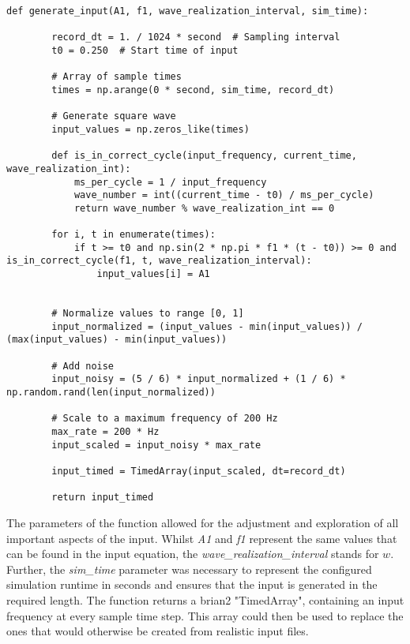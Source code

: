     \begin{lstlisting}[caption={Generate Input Function}]
    def generate_input(A1, f1, wave_realization_interval, sim_time):
        
        record_dt = 1. / 1024 * second  # Sampling interval
        t0 = 0.250  # Start time of input
    
        # Array of sample times
        times = np.arange(0 * second, sim_time, record_dt)
    
        # Generate square wave
        input_values = np.zeros_like(times)
    
        def is_in_correct_cycle(input_frequency, current_time, wave_realization_int):
            ms_per_cycle = 1 / input_frequency
            wave_number = int((current_time - t0) / ms_per_cycle)
            return wave_number % wave_realization_int == 0
    
        for i, t in enumerate(times):
            if t >= t0 and np.sin(2 * np.pi * f1 * (t - t0)) >= 0 and is_in_correct_cycle(f1, t, wave_realization_interval):
                input_values[i] = A1
    
    
        # Normalize values to range [0, 1]
        input_normalized = (input_values - min(input_values)) / (max(input_values) - min(input_values))
    
        # Add noise
        input_noisy = (5 / 6) * input_normalized + (1 / 6) * np.random.rand(len(input_normalized))
    
        # Scale to a maximum frequency of 200 Hz
        max_rate = 200 * Hz
        input_scaled = input_noisy * max_rate
    
        input_timed = TimedArray(input_scaled, dt=record_dt)
    
        return input_timed
    \end{lstlisting}
    The parameters of the function allowed for the adjustment and exploration of all important aspects of the input. Whilst \textit{A1} and \textit{f1} represent the same values that can be found in the input equation, the \textit{wave\_realization\_interval} stands for \(w\). Further, the \textit{sim\_time} parameter was necessary to represent the configured simulation runtime in seconds and ensures that the input is generated in the required length. The function returns a brian2 "TimedArray", containing an input frequency at every sample time step. This array could then be used to replace the ones that would otherwise be created from realistic input files. 



